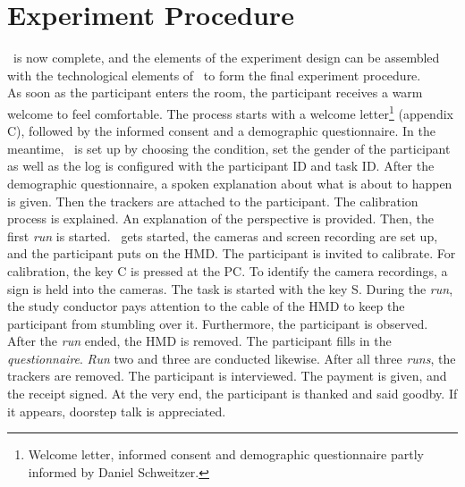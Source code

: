 \section{Experiment Procedure}
\label{sec:procedure}
\exgo\ is now complete, and the elements of the experiment design can be assembled with the technological elements of \exgo\ to form the final experiment procedure.\\
As soon as the participant enters the room, the participant receives a warm welcome to feel comfortable. The process starts with a welcome letter\footnote{Welcome letter, informed consent and demographic questionnaire partly informed by Daniel Schweitzer.} (appendix C), followed by the informed consent and a demographic questionnaire. In the meantime, \exgo\ is set up by choosing the condition, set the gender of the participant as well as the log is configured with the participant ID and task ID. After the demographic questionnaire, a spoken explanation about what is about to happen is given. Then the trackers are attached to the participant. The calibration process is explained. An explanation of the perspective is provided. Then, the first \textit{run} is started. \exgo\ gets started, the cameras and screen recording are set up, and the participant puts on the HMD. The participant is invited to calibrate. For calibration, the key C is pressed at the PC. To identify the camera recordings, a sign is held into the cameras. The task is started with the key S. During the \textit{run}, the study conductor pays attention to the cable of the HMD to keep the participant from stumbling over it. Furthermore, the participant is observed. After the \textit{run} ended, the HMD is removed. The participant fills in the \textit{questionnaire}. \textit{Run} two and three are conducted likewise. After all three \textit{runs}, the trackers are removed. The participant is interviewed. The payment is given, and the receipt signed. At the very end, the participant is thanked and said goodby. If it appears, doorstep talk is appreciated.

